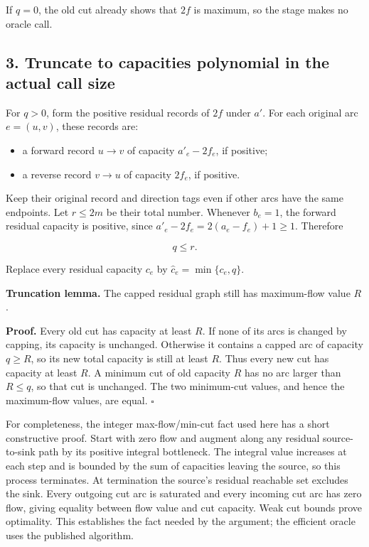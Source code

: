 If \(q=0\), the old cut already shows that \(2f\) is maximum, so the stage makes no oracle call.

\hypertarget{af-bcf24248b3-truncate-to-capacities-polynomial-in-the-actual-call-size}{%
\subsection{3. Truncate to capacities polynomial in the actual call size}\label{af-bcf24248b3-truncate-to-capacities-polynomial-in-the-actual-call-size}}

For \(q>0\), form the positive residual records of \(2f\) under \(a'\). For each original arc \(e=(u,v)\), these records are:

\begin{itemize}
\tightlist
\item
  a forward record \(u\to v\) of capacity \(a'_e-2f_e\), if positive;
\item
  a reverse record \(v\to u\) of capacity \(2f_e\), if positive.
\end{itemize}

Keep their original record and direction tags even if other arcs have the same endpoints. Let \(r\leq2m\) be their total number. Whenever \(b_e=1\), the forward residual capacity is positive, since \(a'_e-2f_e=2(a_e-f_e)+1\geq1\). Therefore

\[
q\leq r.
\]

Replace every residual capacity \(c_e\) by \(\widehat c_e=\min\{c_e,q\}\).

\textbf{Truncation lemma.} The capped residual graph still has maximum-flow value \(R\).

\textbf{Proof.} Every old cut has capacity at least \(R\). If none of its arcs is changed by capping, its capacity is unchanged. Otherwise it contains a capped arc of capacity \(q\geq R\), so its new total capacity is still at least \(R\). Thus every new cut has capacity at least \(R\). A minimum cut of old capacity \(R\) has no arc larger than \(R\leq q\), so that cut is unchanged. The two minimum-cut values, and hence the maximum-flow values, are equal. \hfill\(\square\)

For completeness, the integer max-flow/min-cut fact used here has a short constructive proof. Start with zero flow and augment along any residual source-to-sink path by its positive integral bottleneck. The integral value increases at each step and is bounded by the sum of capacities leaving the source, so this process terminates. At termination the source's residual reachable set excludes the sink. Every outgoing cut arc is saturated and every incoming cut arc has zero flow, giving equality between flow value and cut capacity. Weak cut bounds prove optimality. This establishes the fact needed by the argument; the efficient oracle uses the published algorithm.

